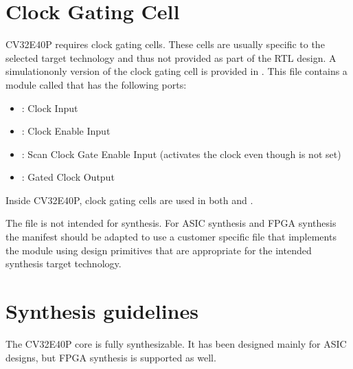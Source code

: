 \documentclass[letterpaper,10pt,english]{sphinxmanual}
\begin{document}
\section{Clock Gating Cell}
\label{\detokenize{integration:clock-gating-cell}}\label{\detokenize{integration:id4}}
\sphinxAtStartPar
CV32E40P requires clock gating cells.
These cells are usually specific to the selected target technology and thus not provided as part of the RTL design.
A simulation\sphinxhyphen{}only version of the clock gating cell is provided in . This file contains
a module called  that has the following ports:
\begin{itemize}
\item {} 
\sphinxAtStartPar
{}: Clock Input

\item {} 
\sphinxAtStartPar
{}: Clock Enable Input

\item {} 
\sphinxAtStartPar
{}: Scan Clock Gate Enable Input (activates the clock even though  is not set)

\item {} 
\sphinxAtStartPar
{}: Gated Clock Output

\end{itemize}

\sphinxAtStartPar
Inside CV32E40P, clock gating cells are used in both  and .

\sphinxAtStartPar
The  file is not intended for synthesis. For ASIC synthesis and FPGA synthesis the manifest
should be adapted to use a customer specific file that implements the  module using design primitives
that are appropriate for the intended synthesis target technology.


\section{Synthesis guidelines}
\label{\detokenize{integration:synthesis-guidelines}}\label{\detokenize{integration:id5}}
\sphinxAtStartPar
The CV32E40P core is fully synthesizable.
It has been designed mainly for ASIC designs, but FPGA synthesis is supported as well.
\end{document}
